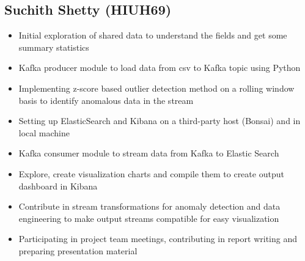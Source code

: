 \documentclass{article}
\begin{document}
\subsection{Suchith Shetty (HIUH69)}
\begin{itemize}
    \item Initial exploration of shared data to understand the fields and get some summary statistics
    \item Kafka producer module to load data from csv to Kafka topic using Python
    \item Implementing z-score based outlier detection method on a rolling window basis to identify anomalous data in the stream
    \item Setting up ElasticSearch and Kibana on a third-party host (Bonsai) and in local machine
    \item Kafka consumer module to stream data from Kafka to Elastic Search
    \item Explore, create visualization charts and compile them to create output dashboard in Kibana
    \item Contribute in stream transformations for anomaly detection and data engineering to make output streams compatible for easy visualization
    \item Participating in project team meetings, contributing in report writing and preparing presentation material
\end{itemize}
\end{document}
